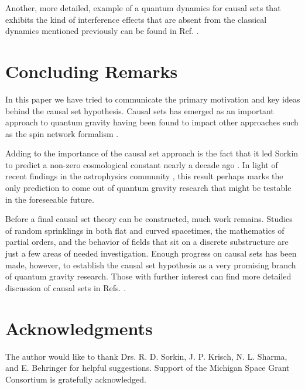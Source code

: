 \documentclass[aps,amssymb,12pt]{revtex4-2}
\begin{document}
Another, more detailed, example of a quantum dynamics for causal sets that
exhibits the kind of interference effects that are absent from the classical
dynamics mentioned previously can be found in Ref. \cite{31}.

\section{Concluding Remarks}

In this paper we have tried to communicate the primary motivation and key
ideas behind the causal set hypothesis. Causal sets has emerged as an
important approach to quantum gravity having been found to impact other
approaches such as the spin network formalism \cite{32}.

Adding to the importance of the causal set approach is the fact that it led
Sorkin to predict a non-zero cosmological constant nearly a decade ago \cite{25}.
In light of recent findings in the astrophysics community \cite{33, 34}, this
result perhaps marks the only prediction to come out of quantum gravity
research that might be testable in the foreseeable future.

Before a final causal set theory can be constructed, much work remains.
Studies of random sprinklings in both flat and curved spacetimes, the
mathematics of partial orders, and the behavior of fields that sit on a
discrete substructure are just a few areas of needed investigation. Enough
progress on causal sets has been made, however, to establish the causal set
hypothesis as a very promising branch of quantum gravity research. Those
with further interest can find more detailed discussion of causal sets in
Refs. \cite{35, 36}.

\section{Acknowledgments}

The author would like to thank Drs. R. D. Sorkin, J. P. Krisch, N. L.
Sharma, and E. Behringer for helpful suggestions. Support of the Michigan
Space Grant Consortium is gratefully acknowledged.

\newpage
\end{document}
